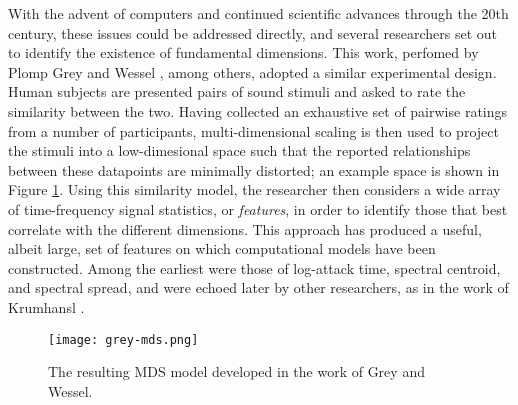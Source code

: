 With the advent of computers and continued scientific advances through the 20th century, these issues could be addressed directly, and several researchers set out to identify the existence of fundamental dimensions.
This work, perfomed by Plomp \cite{Plomp1976} Grey and Wessel \cite{Grey1979}, among others, adopted a similar experimental design.
Human subjects are presented pairs of sound stimuli and asked to rate the similarity between the two.
Having collected an exhaustive set of pairwise ratings from a number of participants, multi-dimensional scaling is then used to project the stimuli into a low-dimesional space such that the reported relationships between these datapoints are minimally distorted; an example space is shown in Figure \ref{fig:grey_mds}.
Using this similarity model, the researcher then considers a wide array of time-frequency signal statistics, or \emph{features}, in order to identify those that best correlate with the different dimensions.
This approach has produced a useful, albeit large, set of features on which computational models have been constructed.
Among the earliest were those of log-attack time, spectral centroid, and spectral spread, and were echoed later by other researchers, as in the work of Krumhansl \cite{}.

\begin{figure}[t]
\centering
\texttt{[image: grey-mds.png]}
\caption{The resulting MDS model developed in the work of Grey and Wessel.}
\label{fig:grey_mds}
\end{figure}


